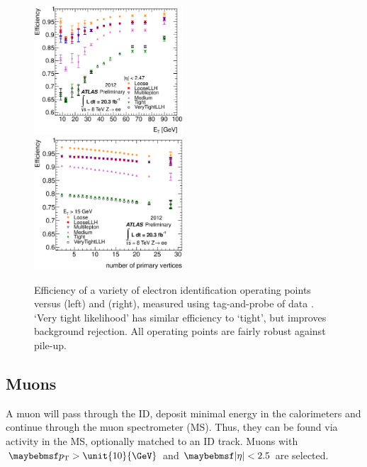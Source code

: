 \begin{description}
	\begin{figure}
		\includegraphics[width=0.495\textwidth]{tex/selection/el_ideff_et}
		\hfill
		\includegraphics[width=0.495\textwidth]{tex/selection/el_ideff_npv}
		\caption{Efficiency of a variety of electron identification operating points 
		versus \et (left) and \npv (right), measured using tag-and-probe of 
		\HepProcess{\PZ \HepTo \Pe\Pe} data \cite{ElectronPerf:2012}. `Very tight 
		likelihood' has similar efficiency to `tight', but improves background rejection. 
		All operating points are fairly robust against pile-up.}
		\label{fig:objects:el_ideff}
	\end{figure}

\end{description}



\subsection{Muons}
\label{sec:objects:muons}

A muon will pass through the ID, deposit minimal energy in the calorimeters and 
continue through the muon spectrometer (MS). Thus, they can be found via activity in the 
MS, optionally matched to an ID track. Muons with $\pt > \unit{10}{\GeV}$ and 
$\mods{\eta} < 2.5$ are selected.

